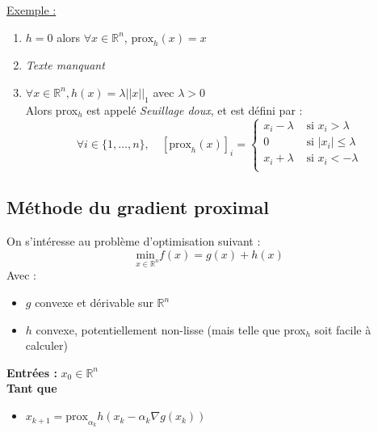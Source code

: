 \documentclass[12pt,a4paper]{article}
\begin{document}
\noindent\underline{Exemple :}
\begin{enumerate}[label=\roman*)]
    \item $h = 0$ alors $\forall x \in \mathbb{R}^n$, $\text{prox}_h(x) = x$\\
    
    \item \textit{Texte manquant}\\

    \item $\forall x \in \mathbb{R}^n, h(x) = \lambda ||x||_1$ avec $\lambda > 0$\\
    Alors prox$_h$ est appelé \textit{Seuillage doux}, et est défini par :\\
    \begin{equation}
        \forall i \in \{1, \dots, n\}, \quad \left[ \text{prox}_h(x) \right]_i = \begin{cases}
            x_i - \lambda &\text{ si } x_i > \lambda\\
            0 &\text{ si } |x_i| \leq \lambda\\
            x_i + \lambda &\text{ si } x_i < -\lambda\\
        \end{cases}
    \end{equation}
\end{enumerate}


\subsection{Méthode du gradient proximal}
On s'intéresse au problème d'optimisation suivant :\\
\begin{equation}
    \underset{x \in \mathbb{R}^n}{\text{min }} f(x) = g(x) + h(x) 
    \label{eq:pb4}
\end{equation}
Avec : \begin{itemize}
    \item $g$ convexe et dérivable sur $\mathbb{R}^n$
    \item $h$ convexe, potentiellement non-lisse (mais telle que prox$_h$ soit facile à calculer)
\end{itemize}

\begin{algorithm}
    \SetAlgoLined
    \textbf{Entrées :} $x_0 \in \mathbb{R}^n$\\
    \textbf{Tant que}\\
    \begin{itemize}
        \item $x_{k+1} = \text{prox}_{\alpha_k} h (x_k - \alpha_k \nabla g(x_k))$       
    \end{itemize}
\end{algorithm}
\end{document}
